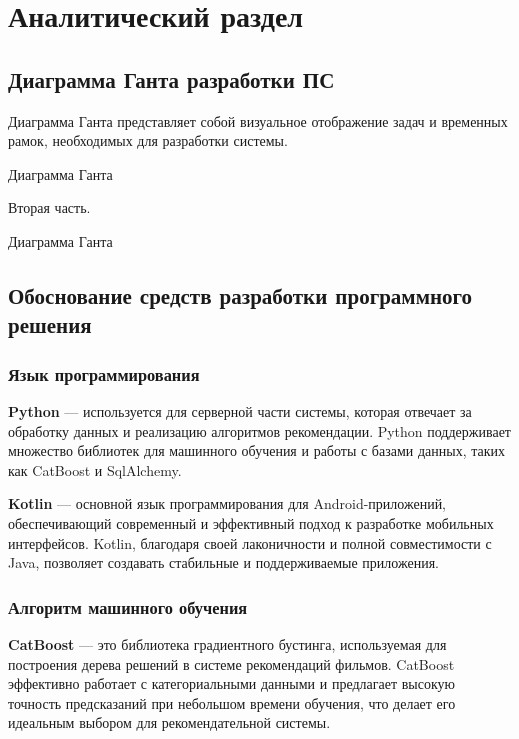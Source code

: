 \chapter{Аналитический раздел}

\section{Диаграмма Ганта разработки ПС}
Диаграмма Ганта представляет собой визуальное отображение задач
и временных рамок, необходимых для разработки системы.


\begin{image}
	\caption{Диаграмма Ганта}
	\label{fig:gant:1}
\end{image}

Вторая часть.

\begin{image}
	\caption{Диаграмма Ганта}
	\label{fig:gant:2}
\end{image}


\section{Обоснование средств разработки программного решения}

\subsection{Язык программирования}
\textbf{Python} — используется для серверной части системы, которая отвечает за обработку данных и реализацию алгоритмов рекомендации. Python поддерживает множество библиотек для машинного обучения и работы с базами данных, таких как CatBoost и SqlAlchemy.

\textbf{Kotlin} — основной язык программирования для Android-приложений, обеспечивающий современный и эффективный подход к разработке мобильных интерфейсов. Kotlin, благодаря своей лаконичности и полной совместимости с Java, позволяет создавать стабильные и поддерживаемые приложения.

\subsection{Алгоритм машинного обучения}
\textbf{CatBoost} — это библиотека градиентного бустинга, используемая для построения дерева решений в системе рекомендаций фильмов. CatBoost эффективно работает с категориальными данными и предлагает высокую точность предсказаний при небольшом времени обучения, что делает его идеальным выбором для рекомендательной системы.

